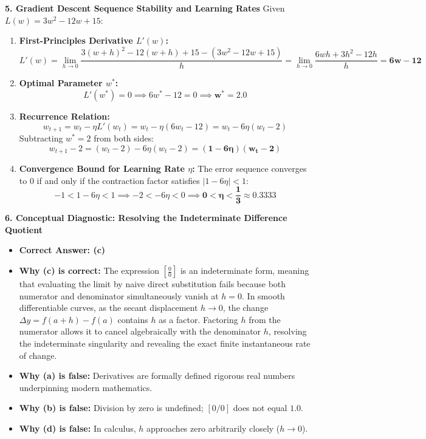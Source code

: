 \textbf{5. Gradient Descent Sequence Stability and Learning Rates}
Given $L(w) = 3w^2 - 12w + 15$:
\begin{enumerate}
    \item \textbf{First-Principles Derivative $L'(w)$:}
    $$L'(w) = \lim_{h \to 0} \frac{3(w+h)^2 - 12(w+h) + 15 - (3w^2 - 12w + 15)}{h} = \lim_{h \to 0} \frac{6wh + 3h^2 - 12h}{h} = \mathbf{6w - 12}$$
    \item \textbf{Optimal Parameter $w^*$:}
    $$L'(w^*) = 0 \implies 6w^* - 12 = 0 \implies \mathbf{w^* = 2.0}$$
    \item \textbf{Recurrence Relation:}
    $$w_{t+1} = w_t - \eta L'(w_t) = w_t - \eta(6w_t - 12) = w_t - 6\eta(w_t - 2)$$
    Subtracting $w^* = 2$ from both sides:
    $$w_{t+1} - 2 = (w_t - 2) - 6\eta(w_t - 2) = \mathbf{(1 - 6\eta)(w_t - 2)}$$
    \item \textbf{Convergence Bound for Learning Rate $\eta$:}
    The error sequence converges to $0$ if and only if the contraction factor satisfies $|1 - 6\eta| < 1$:
    $$-1 < 1 - 6\eta < 1 \implies -2 < -6\eta < 0 \implies \mathbf{0 < \eta < \frac{1}{3} \approx 0.3333}$$
\end{enumerate}

\textbf{6. Conceptual Diagnostic: Resolving the Indeterminate Difference Quotient}
\begin{itemize}
    \item \textbf{Correct Answer: (c)}
    \item \textbf{Why (c) is correct:} The expression $\left[\frac{0}{0}\right]$ is an indeterminate form, meaning that evaluating the limit by naive direct substitution fails because both numerator and denominator simultaneously vanish at $h = 0$. In smooth differentiable curves, as the secant displacement $h \to 0$, the change $\Delta y = f(a+h) - f(a)$ contains $h$ as a factor. Factoring $h$ from the numerator allows it to cancel algebraically with the denominator $h$, resolving the indeterminate singularity and revealing the exact finite instantaneous rate of change.
    \item \textbf{Why (a) is false:} Derivatives are formally defined rigorous real numbers underpinning modern mathematics.
    \item \textbf{Why (b) is false:} Division by zero is undefined; $[0/0]$ does not equal $1.0$.
    \item \textbf{Why (d) is false:} In calculus, $h$ approaches zero arbitrarily closely ($h \to 0$).
\end{itemize}

